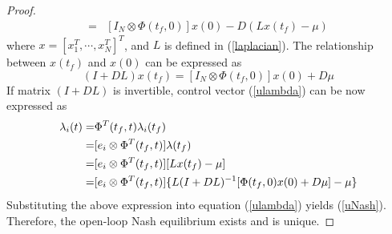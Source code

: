 \documentclass[12pt,draftcls,onecolumn]{IEEEtran}  %
\begin{document}
\begin{proof}
\begin{align*}
=&[I_N\otimes \Phi(t_f,0)]x(0)-D(Lx(t_f)-\mu)
\end{align*}
where $x=[x^T_{1},\cdots,x^T_{N}]^T$, and $L$ is defined in (\ref{laplacian}). The relationship between $x(t_f)$ and $x(0)$ can be expressed as
\begin{equation}
(I+DL)x(t_f)=[I_N\otimes\Phi(t_f,0)]x(0)+D\mu\label{pfp0}
\end{equation}
If matrix $(I+DL)$ is invertible, control vector (\ref{ulambda}) can be now expressed as
\begin{align}
\lambda_i(t)=& \Phi^T(t_f,t)\lambda_i(t_f)\notag\\
=&[e_i\otimes\Phi^T(t_f,t)]\lambda(t_f)\notag\\
=& [e_i\otimes\Phi^T(t_f,t)] [Lx(t_f)-\mu]\notag\\
=& [e_i\otimes\Phi^T(t_f,t)] \{L(I+DL)^{-1}[\Phi(t_f,0)x(0)+D\mu]-\mu\}\label{ulamdapv}
\end{align}
Substituting the above expression into equation (\ref{ulambda}) yields (\ref{uNash}). Therefore, the open-loop Nash equilibrium exists and is unique.
\end{proof}
\end{document}
